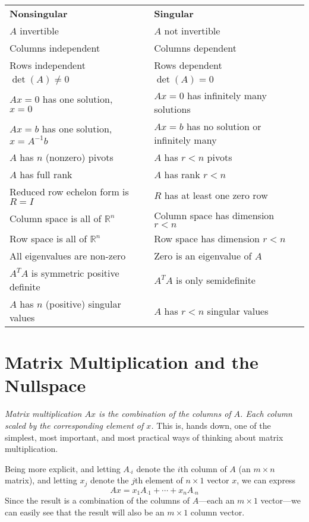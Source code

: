 \documentclass[12pt]{article}
\theoremstyle{plain}
\theoremstyle{definition}
\theoremstyle{remark}
\begin{document}
\begin{table}[h!]
\centering
\begin{tabular}{lll}
\textbf{Nonsingular}                     && \textbf{Singular} \\
$A$ invertible                           && $A$ not invertible \\
Columns independent                      && Columns dependent \\
Rows independent                         && Rows dependent \\
$\det(A)\neq0$                           && $\det(A)=0$ \\
$Ax = 0$ has one solution, $x = 0$       && $Ax=0$ has infinitely many solutions\\
$Ax = b$ has one solution, $x = A^{-1}b$ && $Ax = b$ has no solution or infinitely many \\
$A$ has $n$ (nonzero) pivots             && $A$ has $r<n$ pivots \\
$A$ has full rank                        && $A$ has rank $r<n$ \\
Reduced row echelon form is $R = I$      && $R$ has at least one zero row \\
Column space is all of $\mathbb{R}^n$    && Column space has dimension $r<n$ \\
Row space is all of $\mathbb{R}^n$       && Row space has dimension $r<n$ \\
All eigenvalues are non-zero             && Zero is an eigenvalue of $A$ \\
$A^T A$ is symmetric positive definite   && $A^T A$ is only semidefinite \\
$A$ has $n$ (positive) singular values   && $A$ has $r<n$ singular values
\end{tabular}
\end{table}

\section{Matrix Multiplication and the Nullspace}

{\sl Matrix multiplication $Ax$ is the combination of the columns of $A$. Each column scaled by the corresponding element of $x$.} This is, hands down, one of the simplest, most important, and most practical ways of thinking about matrix multiplication. 

Being more explicit, and letting $A_{\cdot i}$ denote the $i$th column of $A$ (an $m\times n$ matrix), and letting $x_j$ denote the $j$th element of $n\times 1$ vector $x$, we can express
\[
  A x = x_1 A_{\cdot 1}  + \cdots + x_n A_{\cdot n} 
\]
Since the result is a combination of the columns of $A$---each an $m\times 1$ vector---we can easily see that the result will also be an $m\times 1$ column vector.
\end{document}
